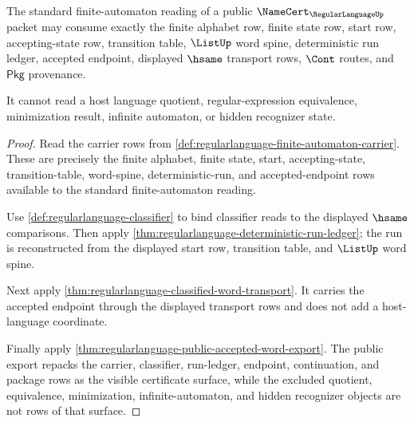 \begin{theorem}
\label{thm:regularlanguage-transition-ledger-standard-boundary}
The standard finite-automaton reading of a public
$\NameCert_{\RegularLanguageUp}$ packet may consume exactly the finite alphabet
row, finite state row, start row, accepting-state row, transition table,
$\ListUp$ word spine, deterministic run ledger, accepted endpoint, displayed
$\hsame$ transport rows, $\Cont$ routes, and $\mathsf{Pkg}$ provenance.

It cannot read a host language quotient, regular-expression equivalence,
minimization result, infinite automaton, or hidden recognizer state.
\end{theorem}
\begin{proof}
Read the carrier rows from
\autoref{def:regularlanguage-finite-automaton-carrier}. These are precisely
the finite alphabet, finite state, start, accepting-state, transition-table,
word-spine, deterministic-run, and accepted-endpoint rows available to the
standard finite-automaton reading.

Use \autoref{def:regularlanguage-classifier} to bind classifier reads to the
displayed $\hsame$ comparisons. Then apply
\autoref{thm:regularlanguage-deterministic-run-ledger}; the run is reconstructed
from the displayed start row, transition table, and $\ListUp$ word spine.

Next apply \autoref{thm:regularlanguage-classified-word-transport}. It carries
the accepted endpoint through the displayed transport rows and does not add a
host-language coordinate.

Finally apply \autoref{thm:regularlanguage-public-accepted-word-export}. The
public export repacks the carrier, classifier, run-ledger, endpoint,
continuation, and package rows as the visible certificate surface, while the
excluded quotient, equivalence, minimization, infinite-automaton, and hidden
recognizer objects are not rows of that surface.
\end{proof}

